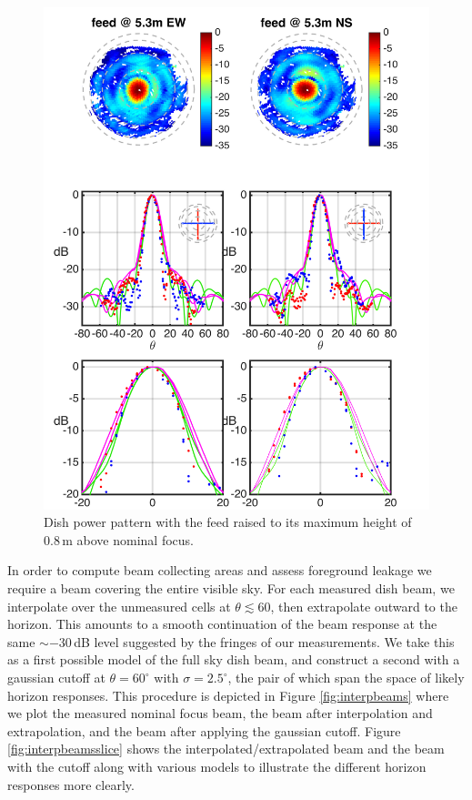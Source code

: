 \documentclass[preprint]{aastex}
\begin{document}
\begin{figure}[h]
\includegraphics[width=6.5in]{dish4_abs_old_ref_model.png}
\caption{Dish power pattern with the feed raised to its maximum height of 0.8\,m above nominal focus.}
\label{fig:dish4}
\end{figure}

In order to compute beam collecting areas and assess foreground leakage we require a beam covering the entire visible sky. For each measured dish beam, we interpolate over the unmeasured cells at $\theta\lesssim60$, then extrapolate outward to the horizon. This amounts to a smooth continuation of the beam response at the same $\sim-30$\,dB level suggested by the fringes of our measurements. We take this as a first possible model of the full sky dish beam, and construct a second with a gaussian cutoff at $\theta=60^\circ$ with $\sigma=2.5^\circ$, the pair of which span the space of likely horizon responses. This procedure is depicted in Figure \ref{fig:interpbeams} where we plot the measured nominal focus beam, the beam after interpolation and extrapolation, and the beam after applying the gaussian cutoff. Figure \ref{fig:interpbeamsslice} shows the interpolated/extrapolated beam and the beam with the cutoff along with various models to illustrate the different horizon responses more clearly.
\end{document}
